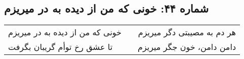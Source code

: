 \begin{center}
\section*{شماره ۴۴: خونی که من از دیده به در میریزم}
\label{sec:044}
\begin{longtable}{l p{0.5cm} r}
خونی که من از دیده به در میریزم
&&
هر دم به مصیبتی دگر میریزم
\\
تا عشق رخ توأم گریبان بگرفت
&&
دامن دامن، خون جگر میریزم
\\
\end{longtable}
\end{center}
